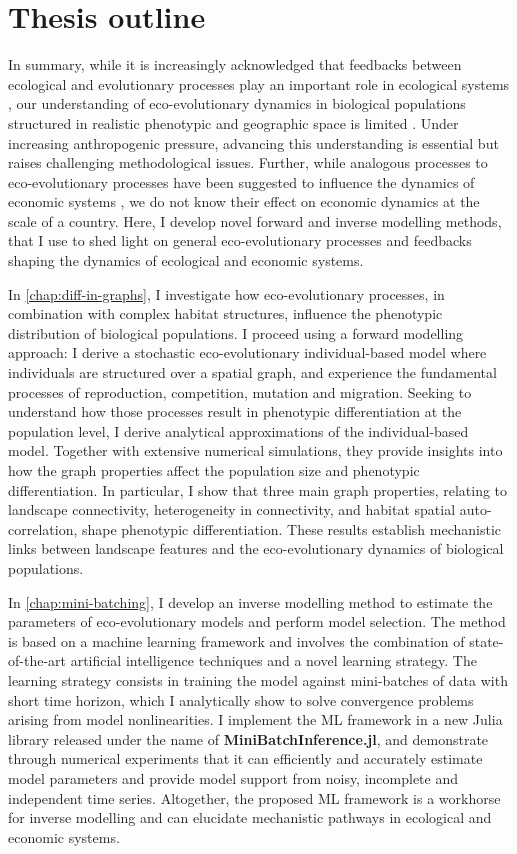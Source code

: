 \section{Thesis outline}

In summary, while it is increasingly acknowledged that feedbacks between ecological and evolutionary processes play an important role in ecological systems \citep{Pelletier2009, Urban2016}, our understanding of eco-evolutionary dynamics in biological populations structured in realistic phenotypic and geographic space is limited \citep{Lion2016,LiebermanHauert2005,Doebeli2011}.
% 
Under increasing anthropogenic pressure, advancing this understanding is essential \citep{Urban2016} but raises challenging methodological issues.
% 
Further, while analogous processes to eco-evolutionary processes have been suggested to influence the dynamics of economic systems \citep{Hodgson2019}, we do not know their effect on economic dynamics at the scale of a country.
% 
Here, I develop novel forward and inverse modelling methods, that I use to shed light on general eco-evolutionary processes and feedbacks shaping the dynamics of ecological and economic systems.


In \cref{chap:diff-in-graphs}, I investigate how eco-evolutionary processes, in combination with complex habitat structures, influence the phenotypic distribution of biological populations. 
I proceed using a forward modelling approach: I derive a stochastic eco-evolutionary individual-based model where individuals are structured over a spatial graph, and experience the fundamental processes of reproduction, competition, mutation and migration. Seeking to understand how those processes result in phenotypic differentiation at the population level, I derive analytical approximations of the individual-based model. Together with extensive numerical simulations, they provide insights into how the graph properties affect the population size and phenotypic differentiation. In particular, I show that three main graph properties, relating to landscape connectivity, heterogeneity in connectivity, and habitat spatial auto-correlation, shape phenotypic differentiation. These results establish mechanistic links between landscape features and the eco-evolutionary dynamics of biological populations.

In \cref{chap:mini-batching}, I develop an inverse modelling method to estimate the parameters of eco-evolutionary models and perform model selection. The method is based on a machine learning framework and involves the combination of state-of-the-art artificial intelligence techniques and a novel learning strategy. The learning strategy consists in training the model against mini-batches of data with short time horizon, which I analytically show to solve convergence problems arising from model nonlinearities. I implement the ML framework in a new Julia library released under the name of \textbf{MiniBatchInference.jl}, and demonstrate through numerical experiments that it can efficiently and accurately estimate model parameters and provide model support from noisy, incomplete and independent time series. Altogether, the proposed ML framework is a workhorse for inverse modelling and can elucidate mechanistic pathways in ecological and economic systems.

